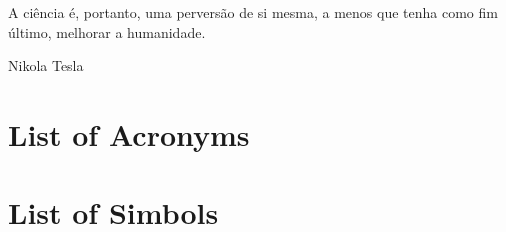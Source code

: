 \documentclass{ufpatcc}
\begin{document}

\begin{ufpaEpigrafe}
A ci\^{e}ncia \'{e}, portanto, uma pervers\~{a}o de si mesma, a menos que tenha
como fim \'{u}ltimo, melhorar a humanidade.\\
\begin{flushright}Nikola Tesla\end{flushright}
\end{ufpaEpigrafe}


\chapter*{List of Acronyms} \label{sec:siglas}


\chapter*{List of Simbols} \label{sec:simbolos}



\listoffigures \clearpage \listoftables \clearpage


\tableofcontents    \clearpage

\end{document}
